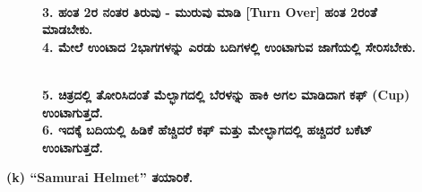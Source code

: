 \vfill\eject

\begin{figure}[H]
\\
\textbf{3. ಹಂತ 2ರ ನಂತರ ತಿರುವು - ಮುರುವು ಮಾಡಿ [Turn Over] ಹಂತ 2ರಂತೆ ಮಾಡಬೇಕು.}\\
\textbf{4. ಮೇಲೆ ಉಂಟಾದ 2ಭಾಗಗಳನ್ನು ಎರಡು ಬದಿಗಳಲ್ಲಿ ಉಂಟಾಗುವ ಜಾಗೆಯಲ್ಲಿ ಸೇರಿಸಬೇಕು.}
\end{figure}
\begin{figure}[H]
\\
\textbf{5. ಚಿತ್ರದಲ್ಲಿ ತೋರಿಸಿದಂತೆ ಮೆಲ್ಭಾಗದಲ್ಲಿ ಬೆರಳನ್ನು ಹಾಕಿ ಅಗಲ ಮಾಡಿದಾಗ ಕಫ್ (Cup) ಉಂಟಾಗುತ್ತದೆ.}\\
\textbf{6. ಇದಕ್ಕೆ ಬದಿಯಲ್ಲಿ ಹಿಡಿಕೆ ಹೆಚ್ಚಿದರೆ ಕಫ್ ಮತ್ತು ಮೇಲ್ಭಾಗದಲ್ಲಿ ಹಚ್ಚಿದರೆ ಬಕೆಟ್ ಉಂಟಾಗುತ್ತದೆ.}
\end{figure}


\noindent
\textbf{(k) ``Samurai Helmet'' ತಯಾರಿಕೆ.}
\begin{figure}[H]
\end{figure}
\newpage
\eject

